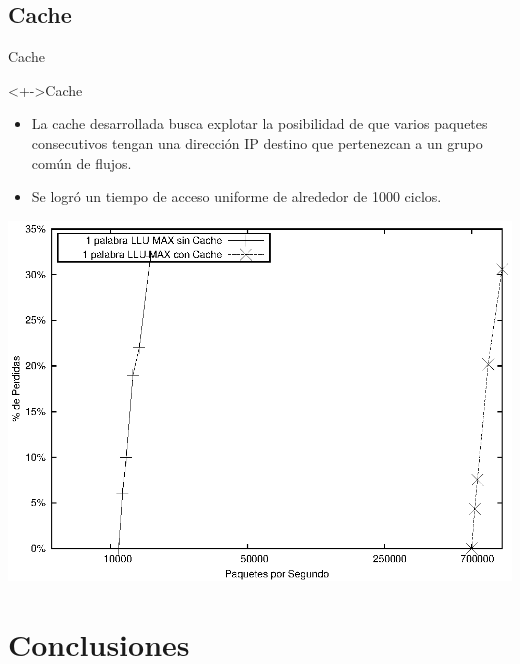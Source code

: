 \documentclass[xcolor=dvipsnames]{beamer}
\begin{document}
\subsection{Cache}
\begin{frame}{Cache} 
 \begin{block}<+->{Cache} 
\begin{itemize}
      \scriptsize
     	\item La cache desarrollada busca explotar la posibilidad de que varios paquetes consecutivos tengan una dirección IP destino que pertenezcan a un grupo común de flujos.
     	\item Se logró un tiempo de acceso uniforme de alrededor de 1000 ciclos.
    \end{itemize}
 \end{block}
\begin{center}
\includegraphics[scale=0.5]{figures/cachecomp.eps} 
\end{center}
\end{frame}

\section{Conclusiones}
\end{document}
